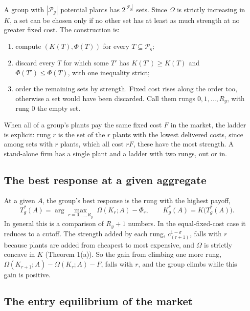 \documentclass[11pt]{article}
\theoremstyle{remark}
\newcommand{\cP}{\mathcal P}
\begin{document}
A group with $|\cP_g|$ potential plants has $2^{|\cP_g|}$ sets. Since $\Omega$ is
strictly increasing in $K$, a set can be chosen only if no other set has at least as
much strength at no greater fixed cost. The construction is:
\begin{enumerate}
\item compute $(K(T),\Phi(T))$ for every $T\subseteq\cP_g$;
\item discard every $T$ for which some $T'$ has $K(T')\ge K(T)$ and
$\Phi(T')\le\Phi(T)$, with one inequality strict;
\item order the remaining sets by strength. Fixed cost rises along the order too,
otherwise a set would have been discarded. Call them rungs $0,1,\dots,R_g$, with rung
0 the empty set.
\end{enumerate}
When all of a group's plants pay the same fixed cost $F$ in the market, the ladder is
explicit: rung $r$ is the set of the $r$ plants with the lowest delivered costs, since
among sets with $r$ plants, which all cost $rF$, these have the most strength. A
stand-alone firm has a single plant and a ladder with two rungs, out or in.

\subsection{The best response at a given aggregate}

At a given $A$, the group's best response is the rung with the highest payoff,
\begin{equation}
  T^*_g(A)=\arg\max_{r=0,\dots,R_g}\;\Omega(K_r;A)-\Phi_r,
  \qquad
  K^*_g(A)=K\bigl(T^*_g(A)\bigr).
  \label{eq:bestresponse}
\end{equation}
In general this is a comparison of $R_g+1$ numbers. In the equal-fixed-cost case it
reduces to a cutoff. The strength added by each rung,
$c_{(r+1)}^{1-\sigma}$, falls with $r$ because plants are added from cheapest to most
expensive, and $\Omega$ is strictly concave in $K$ (Theorem 1(a)). So the gain from
climbing one more rung, $\Omega(K_{r+1};A)-\Omega(K_r;A)-F$, falls with $r$, and the
group climbs while this gain is positive.

\subsection{The entry equilibrium of the market}
\end{document}
